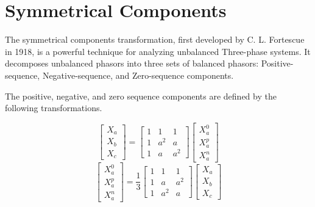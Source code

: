\chapter{Symmetrical Components}\label{App:SymmetricalComponents}
The symmetrical components transformation, first developed by C. L. Fortescue
in 1918, is a powerful technique for analyzing unbalanced Three-phase systems.
It decomposes unbalanced phasors into three sets of balanced phasors:
Positive-sequence, Negative-sequence, and Zero-sequence components.\par
The positive, negative, and zero sequence components are defined by the following
transformations\cite{vechiu2010sequencedecomposition}.\par
\begin{equation}
    \begin{bmatrix}
        X_a \\
        X_b \\
        X_c
    \end{bmatrix}
    =
    \begin{bmatrix}
        1 & 1   & 1   \\
        1 & a^2 & a   \\
        1 & a   & a^2
    \end{bmatrix}
    \begin{bmatrix}
        X^0_a \\
        X^p_a \\
        X^n_a
    \end{bmatrix}
    \label{eq:symmetrical_component_definition}
\end{equation}
\begin{equation}
    \begin{bmatrix}
        X^0_a \\
        X^p_a \\
        X^n_a
    \end{bmatrix}
    =
    \frac{1}{3}
    \begin{bmatrix}
        1 & 1   & 1   \\
        1 & a   & a^2 \\
        1 & a^2 & a
    \end{bmatrix}
    \begin{bmatrix}
        X_a \\
        X_b \\
        X_c
    \end{bmatrix}
    \label{eq:symmetrical_component_calculation}
\end{equation}
